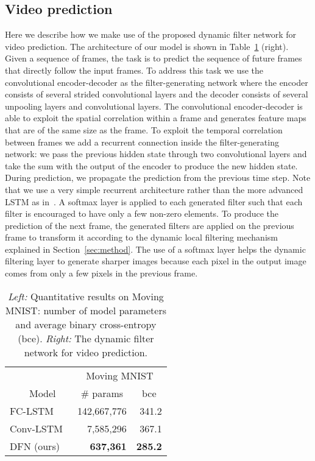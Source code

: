 \subsection{Video prediction}
Here we describe how we make use of the proposed dynamic filter network for video prediction.
The architecture of our model is shown in Table~\ref{table:mnist} (right).
Given a sequence of frames, the task is to predict the sequence of future frames that directly follow the input frames.
To address this task we use the convolutional encoder-decoder as the filter-generating network where the encoder consists of several strided convolutional layers and the decoder consists of several unpooling layers and convolutional layers.
The convolutional encoder-decoder is able to exploit the spatial correlation within a frame and generates feature maps that are of the same size as the frame.
To exploit the temporal correlation between frames we add a recurrent connection inside the filter-generating network: 
we pass  the previous hidden state through two convolutional layers and take the sum with the output of the encoder to produce the new hidden state. During prediction, we propagate the prediction from the previous time step.
Note that we use a very simple recurrent architecture rather than the more advanced LSTM as in~\cite{Srivastava-ICML15,Shi-NIPS15}. 
A softmax layer is applied to each generated filter such that each filter is encouraged to have only a few non-zero elements.
To produce the prediction of the next frame, the generated filters are applied on the previous frame to transform it according to the dynamic local filtering mechanism explained in Section~\ref{sec:method}.
The use of a softmax layer helps the dynamic filtering layer to generate sharper images because each pixel in the output image comes from only a few pixels in the previous frame. 
\begin{table}[t]
\begin{center}\small
\setlength{\tabcolsep}{2pt}
\begin{tabular}[t]{ll||r|r}
\multicolumn{2}{p{1.5cm}||}{~}&
\multicolumn{2}{c}{\centering Moving MNIST}\\
\multicolumn{2}{p{1.5cm}||}{\centering ~~~~Model} &
\multicolumn{1}{c|}{\centering \# params} &
\multicolumn{1}{c}{\centering bce}\\
\hline
\multicolumn{2}{l||}{FC-LSTM~\cite{Srivastava-ICML15}} & 142,667,776 & 341.2\\
\multicolumn{2}{l||}{Conv-LSTM~\cite{Shi-NIPS15}} & 7,585,296 & 367.1\\
\hline
\multicolumn{2}{l||}{DFN (ours)} & \bf{637,361} & \bf{285.2}\\
\end{tabular}
\qquad\quad
{}
\end{center}
\caption{\small \emph{Left:} Quantitative results on Moving MNIST: number of model parameters and average binary cross-entropy (bce). \emph{Right:} 
The dynamic filter network for video prediction.}
\label{table:mnist}
\end{table}

